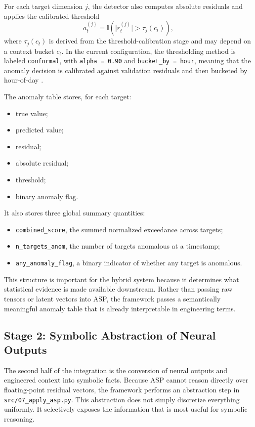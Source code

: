 For each target dimension $j$, the detector also computes absolute residuals and applies the calibrated threshold
\begin{equation}
	a_t^{(j)} = \mathbb{I}\!\left(\lvert r_t^{(j)} \rvert > \tau_j(c_t)\right),
	\label{eq:hybrid_target_flag}
\end{equation}
where $\tau_j(c_t)$ is derived from the threshold-calibration stage and may depend on a context bucket $c_t$. In the current configuration, the thresholding method is labeled \texttt{conformal}, with \texttt{alpha = 0.90} and \texttt{bucket\_by = hour}, meaning that the anomaly decision is calibrated against validation residuals and then bucketed by hour-of-day \cite{repo_thesis_grid_anomaly}.

The anomaly table stores, for each target:
\begin{itemize}
	\item true value;
	\item predicted value;
	\item residual;
	\item absolute residual;
	\item threshold;
	\item binary anomaly flag.
\end{itemize}
It also stores three global summary quantities:
\begin{itemize}
	\item \texttt{combined\_score}, the summed normalized exceedance across targets;
	\item \texttt{n\_targets\_anom}, the number of targets anomalous at a timestamp;
	\item \texttt{any\_anomaly\_flag}, a binary indicator of whether any target is anomalous.
\end{itemize}

This structure is important for the hybrid system because it determines what statistical evidence is made available downstream. Rather than passing raw tensors or latent vectors into ASP, the framework passes a semantically meaningful anomaly table that is already interpretable in engineering terms.

\subsection{Stage 2: Symbolic Abstraction of Neural Outputs}

The second half of the integration is the conversion of neural outputs and engineered context into symbolic facts. Because ASP cannot reason directly over floating-point residual vectors, the framework performs an abstraction step in \texttt{src/07\_apply\_asp.py}. This abstraction does not simply discretize everything uniformly. It selectively exposes the information that is most useful for symbolic reasoning.

